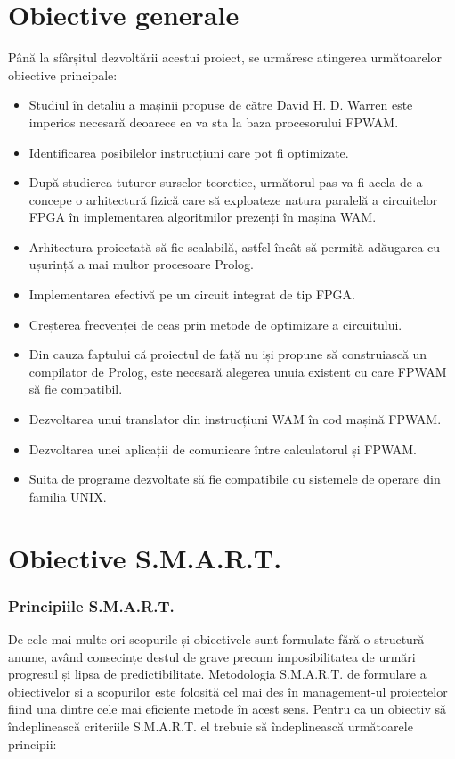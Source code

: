 \documentclass[12pt,a4paper,twoside]{report}
\begin{document}
\section{Obiective generale}
Până la sfârșitul dezvoltării acestui proiect, se urmăresc atingerea următoarelor obiective principale:

\begin{itemize}
\item Studiul în detaliu a mașinii propuse de către David H. D. Warren este imperios necesară deoarece ea va sta la baza procesorului FPWAM.
	\item Identificarea posibilelor instrucțiuni care pot fi optimizate.
	\item După studierea tuturor surselor teoretice, următorul pas va fi acela de a concepe o arhitectură fizică care să exploateze natura paralelă a circuitelor FPGA în implementarea algoritmilor prezenți în mașina WAM.
	\item Arhitectura proiectată să fie scalabilă, astfel încât să permită adăugarea cu ușurință a mai multor procesoare Prolog.
	\item Implementarea efectivă pe un circuit integrat de tip FPGA.
	\item Creșterea frecvenței de ceas prin metode de optimizare a circuitului.
	\item Din cauza faptului că proiectul de față nu iși propune să construiască un compilator de Prolog, este necesară alegerea unuia existent cu care FPWAM să fie compatibil.
	\item Dezvoltarea unui translator din instrucțiuni WAM în cod mașină FPWAM.
	\item Dezvoltarea unei aplicații de comunicare între calculatorul și FPWAM.
	\item Suita de programe dezvoltate să fie compatibile cu sistemele de operare din familia UNIX.
\end{itemize}

\section{Obiective S.M.A.R.T.}
\subsubsection{Principiile S.M.A.R.T.}
De cele mai multe ori scopurile și obiectivele sunt formulate fără o structură anume, având consecințe destul de grave precum imposibilitatea de urmări progresul și lipsa de predictibilitate. Metodologia S.M.A.R.T. de formulare a obiectivelor și a scopurilor este folosită cel mai des în management-ul proiectelor fiind una dintre cele mai eficiente metode în acest sens. Pentru ca un obiectiv să îndeplinească criteriile S.M.A.R.T. el trebuie să îndeplinească următoarele principii:
\end{document}
